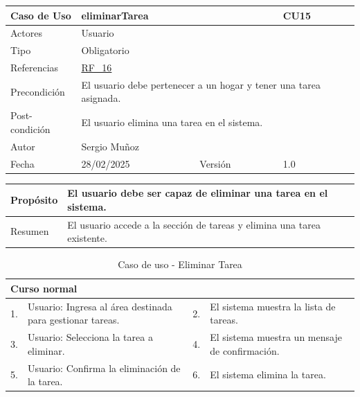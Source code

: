 \newpage

\begin{table}[H]
    \centering
    \begin{tabular}{| m{} | m{} | m{} | m{} |}
        \hline
        \rowcolor[HTML]{C0C0C0} Caso de Uso & \multicolumn{2}{|m{0.43\textwidth}|}{eliminarTarea} &  CU15\\ 
        \hline
        Actores & \multicolumn{3}{l|}{Usuario} \\ 
        \hline
        Tipo & \multicolumn{3}{l|}{Obligatorio} \\ 
        \hline
        Referencias & \multicolumn{3}{l|}{\hyperref[req:RF16]{RF\_16}} \\ 
        \hline
        Precondición & \multicolumn{3}{m{0.67\textwidth}|}{El usuario debe pertenecer a un hogar y tener una tarea asignada.} \\ 
        \hline
        Post-condición & \multicolumn{3}{m{0.67\textwidth}|}{El usuario elimina una tarea en el sistema.} \\ 
        \hline
        Autor & \multicolumn{3}{l|}{Sergio Muñoz} \\ 
        \hline
        Fecha & 28/02/2025 & Versión & 1.0 \\ 
        \hline
    \end{tabular}
\end{table}

\begin{table}[H]
    \centering
    \begin{tabular}{| m{} | m{} | m{} | m{} |}
        \hline
        Propósito & \multicolumn{3}{m{0.67\textwidth}|}{El usuario debe ser capaz de eliminar una tarea en el sistema.} \\ 
        \hline
        Resumen & \multicolumn{3}{m{0.67\textwidth}|}{El usuario accede a la sección de tareas y elimina una tarea existente.} \\ 
        \hline
    \end{tabular}
\end{table}

\begin{table}[H]
    \centering
    \begin{tabular}{| m{} | m{} | m{} | m{} |}
        \hline
        \multicolumn{4}{|m{0.9\textwidth}|}{Curso normal} \\ 
        \hline
        1. & Usuario: Ingresa al área destinada para gestionar tareas.
        & 2. & El sistema muestra la lista de tareas. \\ 
        \hline
        3. & Usuario: Selecciona la tarea a eliminar. 
        & 4. & El sistema muestra un mensaje de confirmación. \\ 
        \hline
        5. & Usuario: Confirma la eliminación de la tarea. 
        & 6. & El sistema elimina la tarea. \\ 
        \hline
    \end{tabular}
    \caption{Caso de uso - Eliminar Tarea}
\end{table}

